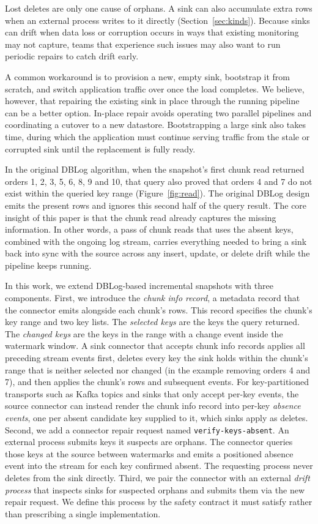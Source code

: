 \documentclass[sigconf,nonacm,10pt]{acmart}
\begin{document}
Lost deletes are only one cause of orphans. A sink can also accumulate extra rows when an external process writes to it 
directly (Section~\ref{sec:kinds}). Because sinks can drift when data loss or corruption occurs in ways that existing monitoring may
not capture, teams that experience such issues may also want to run periodic repairs to catch drift early.

A common workaround is to provision a new, empty sink, bootstrap it from scratch,
and switch application traffic over once the load completes. We believe, however, 
that repairing the existing sink in place through the running pipeline can be a better option.
In-place repair avoids operating two parallel pipelines and coordinating a
cutover to a new datastore. Bootstrapping a large sink also takes time, during
which the application must continue serving traffic from the stale or corrupted
sink until the replacement is fully ready.

In the original DBLog algorithm, when the snapshot's first chunk read returned orders 1, 2,
3, 5, 6, 8, 9 and 10, that query also proved that orders 4 and 7 do not exist
within the queried key range (Figure~\ref{fig:read}). The original DBLog design emits the present rows and ignores this second half 
of the query result. The core insight of this paper is that the chunk read already captures the missing
information. In other words, a pass of chunk reads that uses the absent keys, combined with
the ongoing log stream, carries everything needed to bring a sink back into sync
with the source across any insert, update, or delete drift while the pipeline keeps running.

In this work, we extend DBLog-based incremental snapshots with three components.
First, we introduce the \emph{chunk info record}, a metadata record that the
connector emits alongside each chunk's rows. This record specifies the chunk's
key range and two key lists. The \emph{selected keys} are the keys the query
returned. The \emph{changed keys} are the keys in the range with a change event
inside the watermark window.
A sink connector that accepts chunk info records applies all preceding
stream events first, deletes every key the sink holds within the chunk's range
that is neither selected nor changed (in the example removing orders 4 and 7),
and then applies the chunk's rows and subsequent events. For key-partitioned transports such as Kafka topics and sinks that only
accept per-key events, the source connector can instead render the chunk info record into
per-key \emph{absence events}, one per absent candidate key supplied to it,
which sinks apply as deletes.
Second, we add a connector repair request named
\texttt{verify-keys-absent}. An external process submits keys it suspects are orphans. The connector queries those 
keys at the source between watermarks and emits a positioned absence event into the stream for each key confirmed absent. The requesting 
process never deletes from the sink directly.
Third, we pair the connector with an external \emph{drift process} that inspects
sinks for suspected orphans and submits them via the new repair request. We define
this process by the safety contract it must satisfy rather than prescribing a
single implementation.
\end{document}
